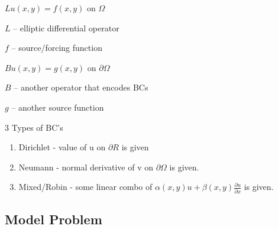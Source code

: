 $L u(x,y) = f(x,y)$ on $\Omega$

$L$ -- elliptic differential operator

$f$ -- source/forcing function

$Bu(x,y) = g(x,y)$ on $\partial \Omega$

$B$ -- another operator that encodes BCs

$g$ -- another source function

\vspace{10px}
3 Types of BC's

\begin{enumerate}
    \item Dirichlet - value of u on $\partial R$ is given

    \item Neumann - normal derivative of v on $\partial \Omega $ is given.

    \item Mixed/Robin - some linear combo of $\alpha(x,y)u+\beta (x,y) \frac{\partial u}{\partial x}$ is given.
\end{enumerate}

\subsection{Model Problem}

